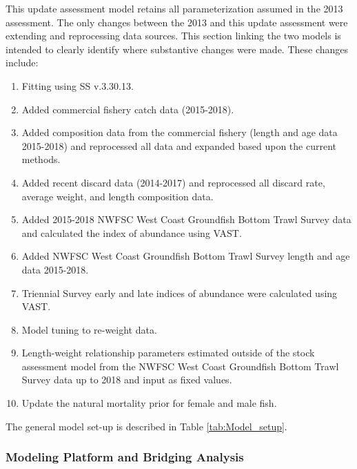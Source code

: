 \documentclass[12pt,]{article}
\begin{document}
This update assessment model retains all parameterization assumed in the
2013 assessment. The only changes between the 2013 and this update
assessment were extending and reprocessing data sources. This section
linking the two models is intended to clearly identify where substantive
changes were made. These changes include:

\begin{enumerate}

\item Fitting using SS v.3.30.13.

\item Added commercial fishery catch data (2015-2018).

\item Added composition data from the commercial fishery (length and age data 2015-2018) and reprocessed all data and expanded based upon the current methods.

\item Added recent discard data (2014-2017) and reprocessed all discard rate, average weight, and length composition data.

\item Added 2015-2018 NWFSC West Coast Groundfish Bottom Trawl Survey  data and calculated the index of abundance using VAST.

\item Added NWFSC West Coast Groundfish Bottom Trawl Survey length and age data 2015-2018.

\item Triennial Survey early and late indices of abundance were calculated using VAST.

\item Model tuning to re-weight data. 

\item Length-weight relationship parameters estimated outside of the stock assessment model from the NWFSC West Coast Groundfish Bottom Trawl Survey data up to 2018 and input as fixed values.

\item Update the natural mortality prior for female and male fish.

\end{enumerate}

The general model set-up is described in Table \ref{tab:Model_setup}.

\subsubsection{Modeling Platform and Bridging
Analysis}\label{modeling-platform-and-bridging-analysis}
\end{document}
